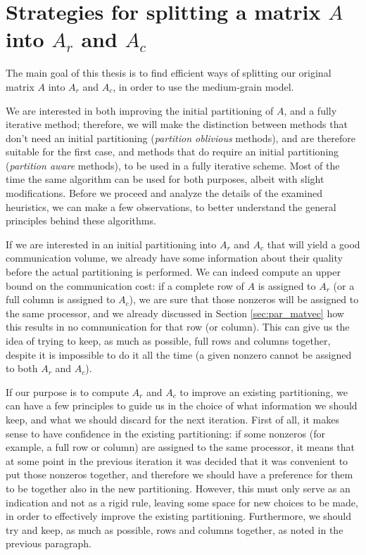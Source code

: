 \chapter{Strategies for splitting a matrix $A$ into $A_r$ and $A_c$} \label{chap:methods}

The main goal of this thesis is to find efficient ways of splitting our original matrix $A$ into $A_r$ and $A_c$, in order to use the medium-grain model.

We are interested in both improving the initial partitioning of $A$, and a fully iterative method; therefore, we will make the distinction between methods that don't need an initial partitioning (\emph{partition oblivious} methods), and are therefore suitable for the first case, and methods that do require an initial partitioning (\emph{partition aware} methods), to be used in a fully iterative scheme. Most of the time the same algorithm can be used for both purposes, albeit with slight modifications.  Before we proceed and analyze the details of the examined heuristics, we can make a few observations, to better understand the general principles behind these algorithms.

If we are interested in an initial partitioning into $A_r$ and $A_c$ that will yield a good communication volume, we already have some information about their quality before the actual partitioning is performed. We can indeed compute an upper bound on the communication cost: if a complete row of $A$ is assigned to $A_r$ (or a full column is assigned to $A_c$), we are sure that those nonzeros will be assigned to the same processor, and we already discussed in Section \ref{sec:par_matvec} how this results in no communication for that row (or column). This can give us the idea of trying to keep, as much as possible, full rows and columns together, despite it is impossible to do it all the time (a given nonzero cannot be assigned to both $A_r$ and $A_c$).

If our purpose is to compute $A_r$ and $A_c$ to improve an existing partitioning, we can have a few principles to guide us in the choice of what information we should keep, and what we should discard for the next iteration. First of all, it makes sense to have confidence in the existing partitioning: if some nonzeros (for example, a full row or column) are assigned to the same processor, it means that at some point in the previous iteration it was decided that it was convenient to put those nonzeros together, and therefore we should have a preference for them to be together also in the new partitioning. However, this must only serve as an indication and not as a rigid rule, leaving some space for new choices to be made, in order to effectively improve the existing partitioning. Furthermore, we should try and keep, as much as possible, rows and columns together, as noted in the previous paragraph.

